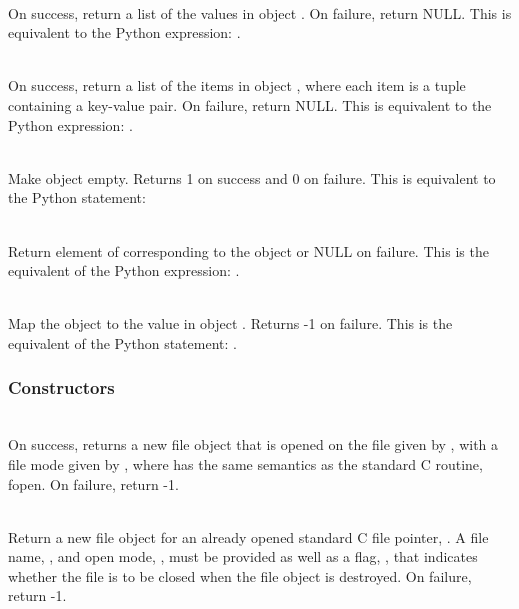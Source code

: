      \\
         On success, return a list of the values in object .  On
	 failure, return NULL. This is equivalent to the Python
	 expression: .


     \\
         On success, return a list of the items in object , where
	 each item is a tuple containing a key-value pair.  On
	 failure, return NULL. This is equivalent to the Python
	 expression: .

     \\
         Make object  empty.  Returns 1 on success and 0 on failure.
	 This is equivalent to the Python statement:


     \\
	 Return element of  corresponding to the object  or NULL
	 on failure. This is the equivalent of the Python expression:
	 .

     \\
         Map the object  to the value  in object .  Returns 
         -1 on failure.  This is the equivalent of the Python
         statement: .


\subsubsection{Constructors}

     \\
	 On success, returns a new file object that is opened on the
	 file given by , with a file mode given by ,
	 where  has the same semantics as the standard C routine,
	 fopen.  On failure, return -1.
     
     \\
	 Return a new file object for an already opened standard C
	 file pointer, .  A file name, , and open mode,
	 , must be provided as well as a flag, , that
	 indicates whether the file is to be closed when the file
	 object is destroyed.  On failure, return -1.

